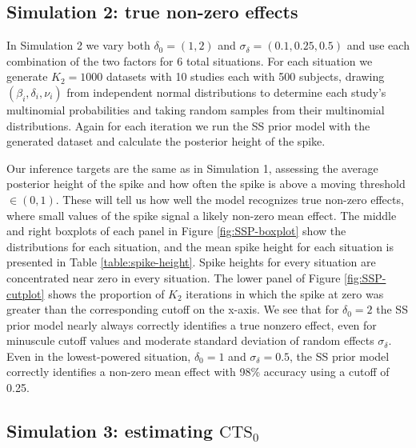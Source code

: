 \documentclass[AMA,STIX1COL]{WileyNJD-v2}
\begin{document}
\subsection{Simulation 2: true non-zero effects} \label{sec:sim_nonzero}

In Simulation 2 we vary both $\delta_0 = (1, 2)$ and $\sigma_\delta = (0.1, 0.25, 0.5)$ and use each combination of the two factors for 6 total situations. For each situation we generate $K_2 = 1000$ datasets with 10 studies each with 500 subjects, drawing $(\beta_i, \delta_i, \nu_i)$ from independent normal distributions to determine each study's multinomial probabilities and taking random samples from their multinomial distributions. Again for each iteration we run the SS prior model with the generated dataset and calculate the posterior height of the spike. 

Our inference targets are the same as in Simulation 1, assessing the average posterior height of the spike and how often the spike is above a moving threshold $\in (0, 1)$. These will tell us how well the model recognizes true non-zero effects, where small values of the spike signal a likely non-zero mean effect. The middle and right boxplots of each panel in Figure \ref{fig:SSP-boxplot} show the distributions for each situation, and the mean spike height for each situation is presented in Table \ref{table:spike-height}. Spike heights for every situation are concentrated near zero in every situation. The lower panel of Figure \ref{fig:SSP-cutplot} shows the proportion of $K_2$ iterations in which the spike at zero was greater than the corresponding cutoff on the x-axis. We see that for $\delta_0 = 2$ the SS prior model nearly always correctly identifies a true nonzero effect, even for minuscule cutoff values and moderate standard deviation of random effects $\sigma_\delta$. Even in the lowest-powered situation, $\delta_0 = 1$ and $\sigma_\delta = 0.5$, the SS prior model correctly identifies a non-zero mean effect with 98\% accuracy using a cutoff of 0.25. 

\subsection{Simulation 3: estimating $\mbox{CTS}_0$} \label{sec:sim_CTS}
\end{document}
